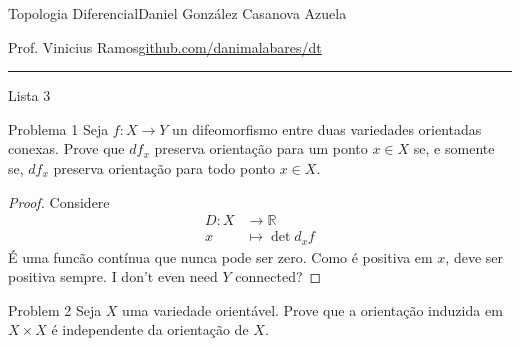 
%




\begin{minipage}{\textwidth}
	\begin{minipage}{1\textwidth}
		Topologia Diferencial\hfill Daniel González Casanova Azuela
		
		{Prof. Vinicius Ramos\hfill\href{https://github.com/danimalabares/dt}{github.com/danimalabares/dt}}
	\end{minipage}
\end{minipage}\vspace{.2cm}\hrule

\vspace{10pt}
{\huge Lista 3}

\vspace{1em}
\begin{thing1}{Problema 1}\label{prob:1}\leavevmode
Seja \(f: X \to Y\) un difeomorfismo entre duas variedades orientadas conexas. Prove que \(df_x\) preserva orientação para um ponto \(x \in X\) se, e somente se, \(df_x\) preserva orientação para todo ponto \(x \in X\).
\end{thing1}

\begin{proof}\leavevmode
Considere
\begin{align*}
	D: X &\longrightarrow \mathbb{R} \\
	x &\longmapsto \det d_xf
\end{align*}
É uma funcão contínua que nunca pode ser zero. Como é positiva em \(x\), deve ser positiva sempre. {\color{7}I don't even need \(Y\) connected?}
\iffalse
	Pelo teorema da função inversa orientado,  existe uma vizinhança \(U\) de  \(x\) na qual \(\det d_zf\) é positivo para todo \(z \in U\).

Como \(X\) é conexa, podemos ligar \(x\) com qualquer outro ponto \(y \in X\) mediante uma curva \(\gamma\). Pegue em cada ponto \(\gamma(t)\) uma vizinhança na qual \(\det d_{z}f\) é positivo em qualquer ponto \(z\) da vizinhança. Como \(\operatorname{Im}\gamma\) é compacto, temos uma quantidade finita de abertos onde \(\det df\) é positivo.\fi
\end{proof}

\begin{thing1}{Problem 2}\label{prob:2}\leavevmode
Seja \(X\) uma variedade orientável. Prove que a orientação induzida em \(X \times X\) é independente da orientação de \(X\).
\end{thing1}


